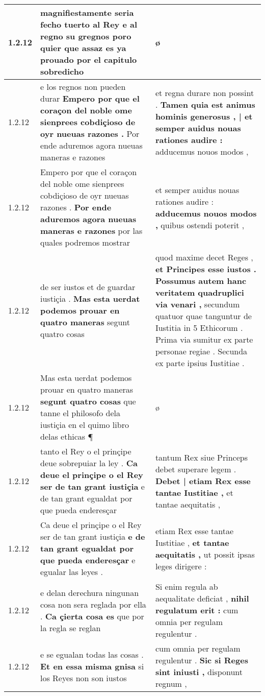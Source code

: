 \begin{tabular}{|p{1cm}|p{6.5cm}|p{6.5cm}|}
1.2.12 & magnifiestamente seria fecho tuerto al Rey e al regno \textbf{ su gregnos poro quier que assaz es ya prouado } por el capitulo sobredicho & ø \\\hline
1.2.12 & e los regnos non pueden durar \textbf{ Empero por que el coraçon del noble ome sienprees cobdiçioso de oyr nueuas razones . } Por ende aduremos agora nueuas maneras e razones & et regna durare non possint . \textbf{ Tamen quia est animus hominis generosus , | et semper auidus nouas rationes audire : } adducemus nouos modos , \\\hline
1.2.12 & Empero por que el coraçon del noble ome sienprees cobdiçioso de oyr nueuas razones . \textbf{ Por ende aduremos agora nueuas maneras e razones } por las quales podremos mostrar & et semper auidus nouas rationes audire : \textbf{ adducemus nouos modos , } quibus ostendi poterit , \\\hline
1.2.12 & de ser iustos et de guardar iustiçia . \textbf{ Mas esta uerdat podemos prouar en quatro maneras } segunt quatro cosas & quod maxime decet Reges , \textbf{ et Principes esse iustos . Possumus autem hanc veritatem quadruplici via venari , } secundum quatuor quae tanguntur de Iustitia in 5 Ethicorum . Prima via sumitur ex parte personae regiae . Secunda ex parte ipsius Iustitiae . \\\hline
1.2.12 & Mas esta uerdat podemos prouar en quatro maneras \textbf{ segunt quatro cosas } que tanne el philosofo dela iustiçia en el quimo libro delas ethicas ¶ & ø \\\hline
1.2.12 & tanto el Rey o el prinçipe deue sobrepuiar la ley . \textbf{ Ca deue el prinçipe o el Rey ser de tan grant iustiçia } e de tan grant egualdat por que pueda enderesçar & tantum Rex siue Princeps debet superare legem . \textbf{ Debet | etiam Rex esse tantae Iustitiae , } et tantae aequitatis , \\\hline
1.2.12 & Ca deue el prinçipe o el Rey ser de tan grant iustiçia \textbf{ e de tan grant egualdat por que pueda enderesçar } e egualar las leyes . & etiam Rex esse tantae Iustitiae , \textbf{ et tantae aequitatis , } ut possit ipsas leges dirigere : \\\hline
1.2.12 & e delan derechura ningunan cosa non sera reglada por ella . \textbf{ Ca çierta cosa es } que por la regla se reglan & Si enim regula ab aequalitate deficiat , \textbf{ nihil regulatum erit : } cum omnia per regulam regulentur . \\\hline
1.2.12 & e se egualan todas las cosas . \textbf{ Et en essa misma gnisa } si los Reyes non son iustos & cum omnia per regulam regulentur . \textbf{ Sic si Reges sint iniusti , } disponunt regnum , \\\hline

\end{tabular}
